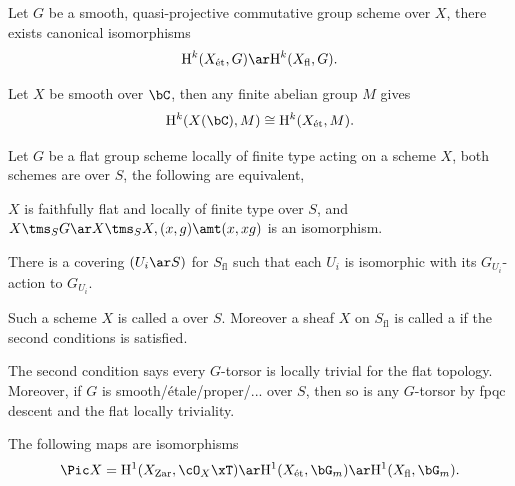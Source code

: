 \documentclass[a4paper, twoside]{article}
\begin{document}
\begin{thm}
  Let $G$ be a smooth, quasi-projective commutative group scheme over $X$, there exists canonical isomorphisms
  \[
    \mathrm{H}_{}^{k}(X_{\text{{\'e}t}}, G)\ar \mathrm{H}_{}^{k}(X_{\text{fl}}, G).
  \]
\end{thm}

\begin{thm}
  Let $X$ be smooth over $\bC$, then any finite abelian group $M$ gives
  \[
    \mathrm{H}_{}^{k}(X(\bC), M)\cong \mathrm{H}_{}^{k}(X_{\text{{\'e}t}}, M).
  \]
\end{thm}

\begin{dfn}[Torsors]
  Let $G$ be a flat group scheme locally of finite type acting on a scheme $X$, both schemes are over $S$, the following are equivalent,
  \begin{itm}
    \item $X$ is faithfully flat and locally of finite type over $S$, and $X\tms_{S}G\ar X\tms_{S}X, (x,g)\amt(x,xg)$ is an isomorphism.
    \item There is a covering $(U_{i}\ar S)$ for $S_{\text{fl}}$ such that each $U_{i}$ is isomorphic with its $G_{U_{i}}$-action to $G_{U_{i}}$.
  \end{itm}
  Such a scheme $X$ is called a  over $S$. Moreover a sheaf $X$ on $S_{\text{fl}}$ is called a  if the second conditions is satisfied.
\end{dfn}
\begin{rmk}
  The second condition says every $G$-torsor is locally trivial for the flat topology. Moreover, if $G$ is smooth/{\'e}tale/proper/... over $S$, then so is any $G$-torsor by fpqc descent and the flat locally triviality.
\end{rmk}

\begin{thm}[Hilbert's 90]
  The following maps are isomorphisms
  \[
   \Pic X=\mathrm{H}_{}^{1}(X_{\text{Zar}}, \cO_{X}\xT) \ar \mathrm{H}_{}^{1}(X_{\text{{\'e}t}}, \bG_{m}) \ar \mathrm{H}_{}^{1}(X_{\text{fl}}, \bG_{m}).
  \]
\end{thm}
\end{document}
